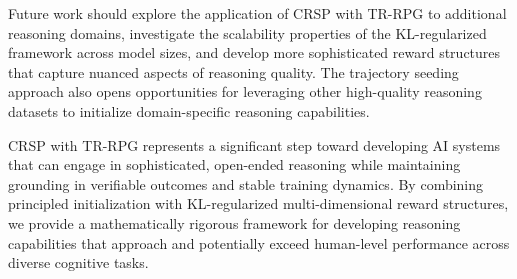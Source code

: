 \documentclass[10pt,a4paper]{article}
\begin{document}
Future work should explore the application of CRSP with TR-RPG to additional reasoning domains, investigate the scalability properties of the KL-regularized framework across model sizes, and develop more sophisticated reward structures that capture nuanced aspects of reasoning quality. The trajectory seeding approach also opens opportunities for leveraging other high-quality reasoning datasets to initialize domain-specific reasoning capabilities.

CRSP with TR-RPG represents a significant step toward developing AI systems that can engage in sophisticated, open-ended reasoning while maintaining grounding in verifiable outcomes and stable training dynamics. By combining principled initialization with KL-regularized multi-dimensional reward structures, we provide a mathematically rigorous framework for developing reasoning capabilities that approach and potentially exceed human-level performance across diverse cognitive tasks.
\end{document}
